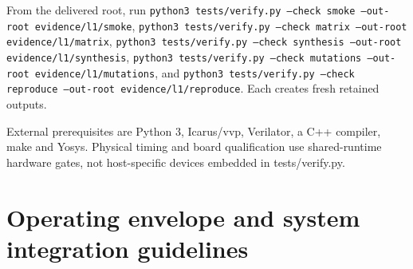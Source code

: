 \documentclass[11pt,a4paper]{article}
\begin{document}
From the deli\allowbreak{}vere\allowbreak{}d root,\allowbreak{} run \texttt{pyth\allowbreak{}on3 test\allowbreak{}s/\allowbreak{}veri\allowbreak{}fy.py --chec\allowbreak{}k smok\allowbreak{}e --out-root evid\allowbreak{}ence/\allowbreak{}l1/\allowbreak{}smok\allowbreak{}e},\allowbreak{} \texttt{pyth\allowbreak{}on3 test\allowbreak{}s/\allowbreak{}veri\allowbreak{}fy.py --chec\allowbreak{}k matr\allowbreak{}ix --out-root evid\allowbreak{}ence/\allowbreak{}l1/\allowbreak{}matr\allowbreak{}ix},\allowbreak{} \texttt{pyth\allowbreak{}on3 test\allowbreak{}s/\allowbreak{}veri\allowbreak{}fy.py --chec\allowbreak{}k synt\allowbreak{}hesi\allowbreak{}s --out-root evid\allowbreak{}ence/\allowbreak{}l1/\allowbreak{}synt\allowbreak{}hesi\allowbreak{}s},\allowbreak{} \texttt{pyth\allowbreak{}on3 test\allowbreak{}s/\allowbreak{}veri\allowbreak{}fy.py --chec\allowbreak{}k muta\allowbreak{}tion\allowbreak{}s --out-root evid\allowbreak{}ence/\allowbreak{}l1/\allowbreak{}muta\allowbreak{}tion\allowbreak{}s},\allowbreak{} and \texttt{pyth\allowbreak{}on3 test\allowbreak{}s/\allowbreak{}veri\allowbreak{}fy.py --chec\allowbreak{}k repr\allowbreak{}oduc\allowbreak{}e --out-root evid\allowbreak{}ence/\allowbreak{}l1/\allowbreak{}repr\allowbreak{}oduc\allowbreak{}e}. Each crea\allowbreak{}tes fres\allowbreak{}h reta\allowbreak{}ined outp\allowbreak{}uts.


Exte\allowbreak{}rnal prer\allowbreak{}equi\allowbreak{}site\allowbreak{}s are Pyth\allowbreak{}on 3,\allowbreak{} Icar\allowbreak{}us/\allowbreak{}vvp,\allowbreak{} Veri\allowbreak{}lato\allowbreak{}r,\allowbreak{} a C+\allowbreak{}+\allowbreak{} comp\allowbreak{}iler,\allowbreak{} make and Yosy\allowbreak{}s. Phys\allowbreak{}ical timi\allowbreak{}ng and boar\allowbreak{}d qual\allowbreak{}ific\allowbreak{}atio\allowbreak{}n use shar\allowbreak{}ed-runt\allowbreak{}ime hard\allowbreak{}ware gate\allowbreak{}s,\allowbreak{} not host-spec\allowbreak{}ific devi\allowbreak{}ces embe\allowbreak{}dded in test\allowbreak{}s/\allowbreak{}veri\allowbreak{}fy.py.


\section{Operating envelope and system integration guidelines}
\end{document}
